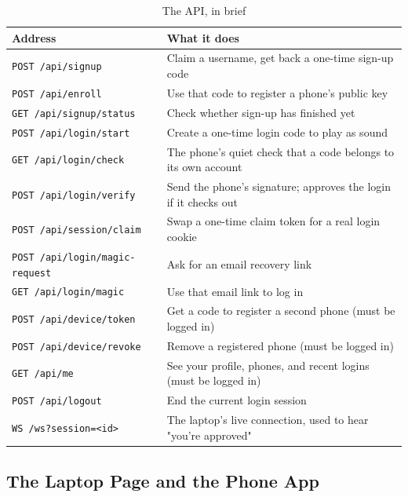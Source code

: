 \begin{table}[htbp]
\centering
\caption{The API, in brief}
\label{tab:api}
\begin{tabular}{|L{4.9cm}|L{7.6cm}|}
\hline
\textbf{Address} & \textbf{What it does} \\
\hline
\texttt{POST /api/\allowbreak signup} & Claim a username, get back a one-time sign-up code \\
\hline
\texttt{POST /api/\allowbreak enroll} & Use that code to register a phone's public key \\
\hline
\texttt{GET /api/\allowbreak signup/\allowbreak status} & Check whether sign-up has finished yet \\
\hline
\texttt{POST /api/\allowbreak login/\allowbreak start} & Create a one-time login code to play as sound \\
\hline
\texttt{GET /api/\allowbreak login/\allowbreak check} & The phone's quiet check that a code belongs to its own account \\
\hline
\texttt{POST /api/\allowbreak login/\allowbreak verify} & Send the phone's signature; approves the login if it checks out \\
\hline
\texttt{POST /api/\allowbreak session/\allowbreak claim} & Swap a one-time claim token for a real login cookie \\
\hline
\texttt{POST /api/\allowbreak login/\allowbreak magic-request} & Ask for an email recovery link \\
\hline
\texttt{GET /api/\allowbreak login/\allowbreak magic} & Use that email link to log in \\
\hline
\texttt{POST /api/\allowbreak device/\allowbreak token} & Get a code to register a second phone (must be logged in) \\
\hline
\texttt{POST /api/\allowbreak device/\allowbreak revoke} & Remove a registered phone (must be logged in) \\
\hline
\texttt{GET /api/\allowbreak me} & See your profile, phones, and recent logins (must be logged in) \\
\hline
\texttt{POST /api/\allowbreak logout} & End the current login session \\
\hline
\texttt{WS /ws?session=<id>} & The laptop's live connection, used to hear "you're approved" \\
\hline
\end{tabular}
\end{table}

\subsection{The Laptop Page and the Phone App}


